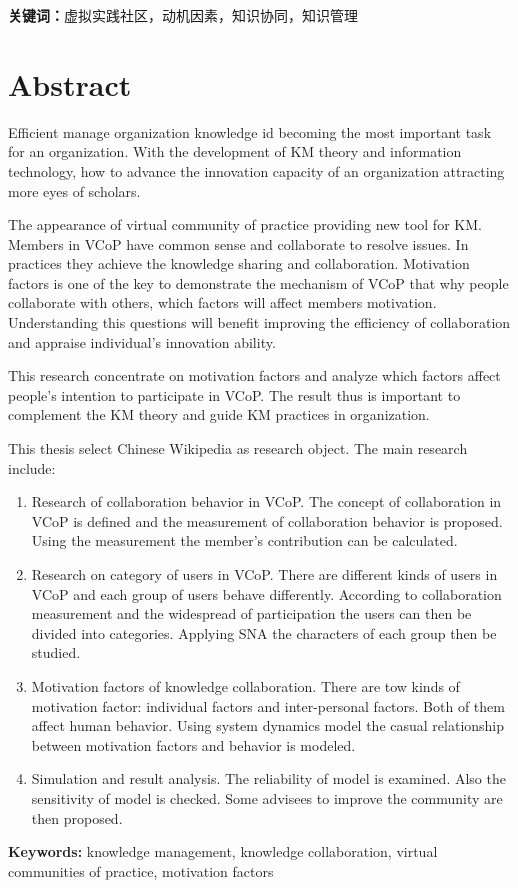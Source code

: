 \documentclass[adobefonts,cs4size,a4paper,openany]{ctexbook}
\begin{document}
\textbf{关键词：}虚拟实践社区，动机因素，知识协同，知识管理

\chapter*{Abstract}
Efficient manage organization knowledge id becoming the most important task for an organization. With the development of KM theory and information technology, how to advance the innovation capacity of an organization attracting more eyes of scholars.

The appearance of virtual community of practice providing new tool for KM. Members in VCoP have common sense and collaborate  to resolve issues. In practices they achieve the knowledge sharing and collaboration. Motivation factors is one of the key to demonstrate the mechanism of VCoP that why people collaborate with others, which factors will affect members motivation. Understanding  this questions will benefit improving the efficiency of collaboration and appraise individual’s innovation ability.

This research concentrate on motivation factors and analyze which factors affect people’s intention to participate in VCoP. The result thus is important to complement the KM theory and guide KM practices in organization.

This thesis select Chinese Wikipedia as research object. The main research include:
\begin{enumerate}
\item  Research of collaboration behavior in VCoP. The concept of
collaboration in VCoP is defined and the measurement of collaboration
behavior is   proposed. Using the measurement the member’s
contribution can be calculated.
\item Research on category of users in VCoP. There are different kinds of
users in VCoP and each group of users behave differently. According to
collaboration measurement and the widespread of participation the
users can then be divided into categories. Applying SNA the characters
of each group then be studied.
\item Motivation factors of knowledge collaboration. There are tow kinds
of motivation factor: individual factors and inter-personal
factors. Both of them affect human behavior. Using system dynamics
model the casual relationship between motivation factors and behavior
is modeled.
\item  Simulation and result analysis. The reliability of model is
examined. Also the sensitivity of model is checked.  Some advisees to
improve the community are then proposed.

\end{enumerate}

\textbf{Keywords:} knowledge management, knowledge collaboration, virtual communities of practice, motivation factors   
\end{document}
